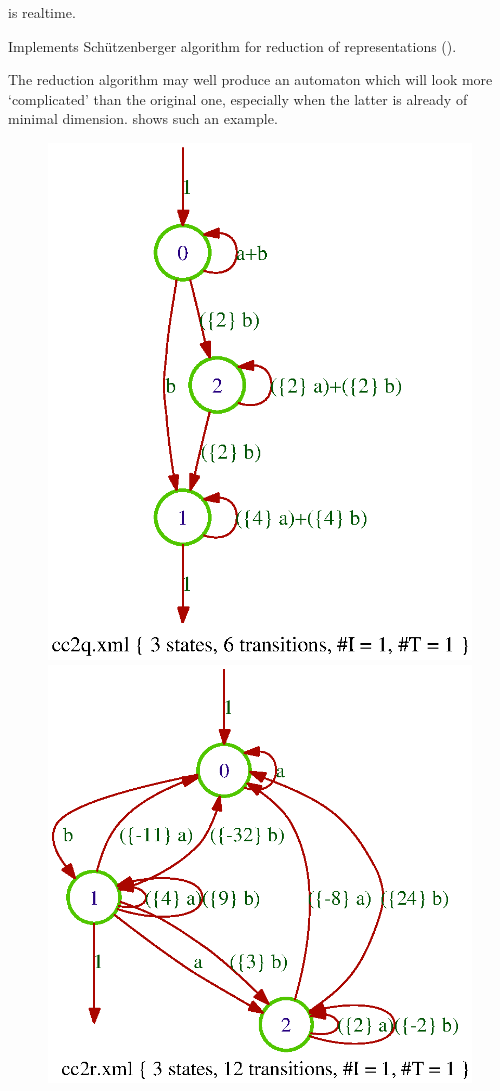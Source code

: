 \Prec {} is realtime.

\Comt Implements Sch\"utzenberger algorithm for reduction of 
representations (\cf {}).

\Cave
\thi The reduction algorithm may well produce an automaton which will 
look more `complicated' than the original one, especially when the 
latter is already of minimal dimension.
 shows such an example.

\begin{figure}[ht]
    \centering
\includegraphics[scale=0.45]{figures/cc2q.ps}
\eee
\includegraphics[scale=0.45]{figures/cc2r.ps}

\end{figure}
